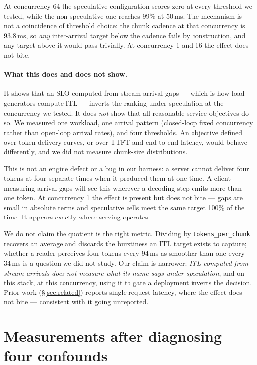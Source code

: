 \documentclass[11pt]{article}
\newcommand{\tw}[1]{\texttt{\small #1}}
\begin{document}
\noindent
At concurrency 64 the speculative configuration scores zero at every
threshold we tested, while the non-speculative one reaches 99\% at 50\,ms.
The mechanism is not a coincidence of threshold choice: the chunk cadence at
that concurrency is 93.8\,ms, so \emph{any} inter-arrival target below the
cadence fails by construction, and any target above it would pass
trivially. At concurrency 1 and 16 the effect does not bite.

\paragraph{What this does and does not show.} It shows that an SLO computed
from stream-arrival gaps --- which is how load generators compute ITL ---
inverts the ranking under speculation at the concurrency we tested. It does
\emph{not} show that all reasonable service objectives do so. We measured
one workload, one arrival pattern (closed-loop fixed concurrency rather than
open-loop arrival rates), and four thresholds. An objective defined over
token-delivery curves, or over TTFT and end-to-end latency, would behave
differently, and we did not measure chunk-size distributions.

This is not an engine defect or a bug in our harness: a server cannot deliver
four tokens at four separate times when it produced them at one time. A
client measuring arrival gaps will see this wherever a decoding step emits
more than one token. At concurrency 1 the
effect is present but does not bite --- gaps are small in absolute terms and
speculative cells meet the same target 100\% of the time. It appears exactly
where serving operates.

We do not claim the quotient is the right metric. Dividing by
\tw{tokens\_per\_chunk} recovers an average and discards the burstiness an
ITL target exists to capture; whether a reader perceives four tokens every
94\,ms as smoother than one every 34\,ms is a question we did not study. Our
claim is narrower: \emph{ITL computed from stream arrivals does not measure
what its name says under speculation}, and on this stack, at this
concurrency, using it to gate a deployment inverts the decision. Prior work
(\S\ref{sec:related}) reports single-request latency, where the effect does
not bite --- consistent with it going unreported.

\section{Measurements after diagnosing four confounds}\label{sec:results}
\end{document}

